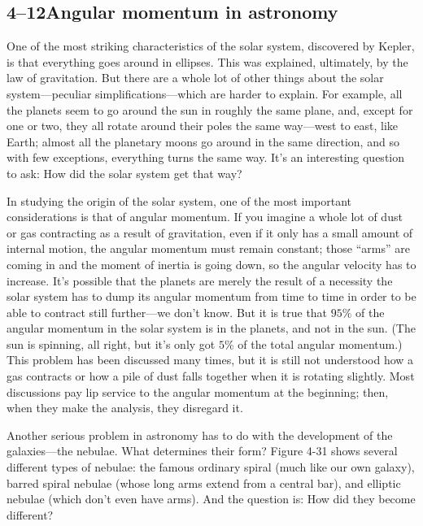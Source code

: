 \documentclass[11pt,oneside]{article}
\begin{document}
\subsection*{4--12Angular momentum in astronomy}

One of the most striking characteristics of the solar system, discovered by Kepler, is that everything goes around in ellipses. This was explained, ultimately, by the law of gravitation. But there are a whole lot of other things about the solar system---peculiar simplifications---which are harder to explain. For example, all the planets seem to go around the sun in roughly the same plane, and, except for one or two, they all rotate around their poles the same way---west to east, like Earth; almost all the planetary moons go around in the same direction, and so with few exceptions, everything turns the same way. It's an interesting question to ask: How did the solar system get that way?\par

In studying the origin of the solar system, one of the most important considerations is that of angular momentum. If you imagine a whole lot of dust or gas contracting as a result of gravitation, even if it only has a small amount of internal motion, the angular momentum must remain constant; those ``arms'' are coming in and the moment of inertia is going down, so the angular velocity has to increase. It's possible that the planets are merely the result of a necessity the solar system has to dump its angular momentum from time to time in order to be able to contract still further---we don't know. But it is true that \(95\%\) of the angular momentum in the solar system is in the planets, and not in the sun. (The sun is spinning, all right, but it's only got \(5\%\) of the total angular momentum.) This problem has been discussed many times, but it is still not understood how a gas contracts or how a pile of dust falls together when it is rotating slightly. Most discussions pay lip service to the angular momentum at the beginning; then, when they make the analysis, they disregard it.\par

Another serious problem in astronomy has to do with the development of the galaxies---the nebulae. What determines their form? Figure 4-31 shows several different types of nebulae: the famous ordinary spiral (much like our own galaxy), barred spiral nebulae (whose long arms extend from a central bar), and elliptic nebulae (which don't even have arms). And the question is: How did they become different?\par
\end{document}
